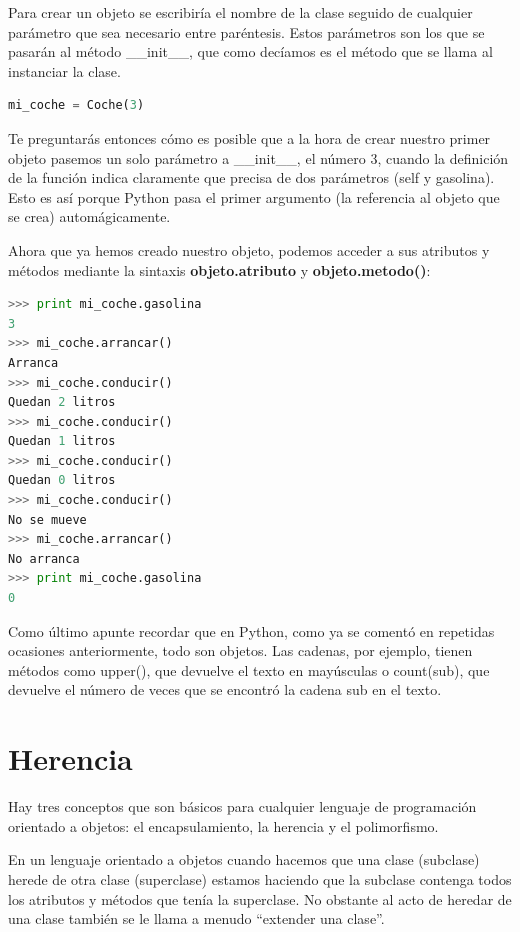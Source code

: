 \documentclass[12pt, twoside]{report}
\begin{document}
Para crear un objeto se escribiría el nombre de la clase seguido de cualquier parámetro que sea necesario entre paréntesis. Estos parámetros son los que se pasarán al método \_\_init\_\_, que como decíamos es el método que se llama al instanciar la clase.

\begin{lstlisting}[language=Python]
mi_coche = Coche(3)
\end{lstlisting}

Te preguntarás entonces cómo es posible que a la hora de crear nuestro primer objeto pasemos un solo parámetro a \_\_init\_\_, el número 3, cuando la definición de la función indica claramente que precisa de dos parámetros (self y gasolina). Esto es así porque Python pasa el primer argumento (la referencia al objeto que se crea) automágicamente.

Ahora que ya hemos creado nuestro objeto, podemos acceder a sus atributos y métodos mediante la sintaxis \textbf{objeto.atributo} y \textbf{objeto.metodo()}:

\begin{lstlisting}[language=Python]
>>> print mi_coche.gasolina
3
>>> mi_coche.arrancar()
Arranca
>>> mi_coche.conducir()
Quedan 2 litros
>>> mi_coche.conducir()
Quedan 1 litros
>>> mi_coche.conducir()
Quedan 0 litros
>>> mi_coche.conducir()
No se mueve
>>> mi_coche.arrancar()
No arranca
>>> print mi_coche.gasolina
0
\end{lstlisting}

Como último apunte recordar que en Python, como ya se comentó en repetidas ocasiones anteriormente, todo son objetos. Las cadenas, por ejemplo, tienen métodos como upper(), que devuelve el texto en mayúsculas o count(sub), que devuelve el número de veces que se encontró la cadena sub en el texto.

\section{Herencia}

Hay tres conceptos que son básicos para cualquier lenguaje de programación orientado a objetos: el encapsulamiento, la herencia y el polimorfismo.

En un lenguaje orientado a objetos cuando hacemos que una clase (subclase) herede de otra clase (superclase) estamos haciendo que la subclase contenga todos los atributos y métodos que tenía la superclase. No obstante al acto de heredar de una clase también se le llama a menudo ``extender una clase''.
\end{document}
